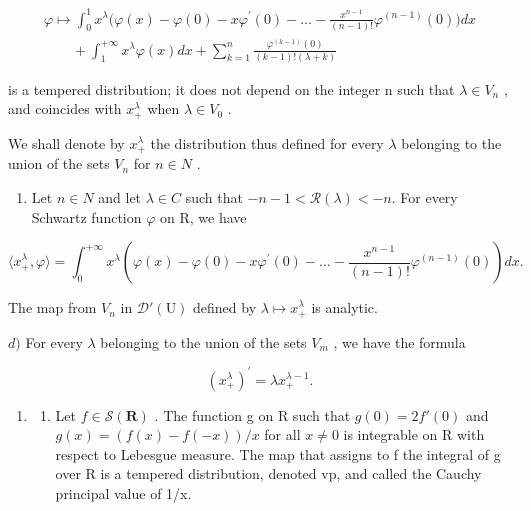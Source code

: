 \[
\begin{array}{l} \varphi \mapsto \int_ {0} ^ {1} x ^ {\lambda} \Big (\varphi (x) - \varphi (0) - x \varphi^ {\prime} (0) - \dots - \frac {x ^ {n - 1}}{(n - 1) !} \varphi^ {(n - 1)} (0) \Big) d x \\ \qquad + \int_ {1} ^ {+ \infty} x ^ {\lambda} \varphi (x) d x + \sum_ {k = 1} ^ {n} \frac {\varphi^ {(k - 1)} (0)}{(k - 1) ! (\lambda + k)} \end{array}
\]

is a tempered distribution; it does not depend on the integer n such that \(\lambda \in V_{n}\) , and coincides with \(x_{+}^{\lambda}\) when \(\lambda \in V_{0}\) .

We shall denote by \(x_{+}^{\lambda}\) the distribution thus defined for every \(\lambda\) belonging to the union of the sets \(V_{n}\) for \(n \in N\) .

\begin{enumerate}
\def\labelenumi{\alph{enumi})}
\setcounter{enumi}{2}
\tightlist
\item
  Let \(n \in N\) and let \(\lambda \in C\) such that \(-n - 1 < \mathcal{R}(\lambda) < -n\). For every Schwartz function \(\varphi\) on R, we have
\end{enumerate}

\[
\langle x _ {+} ^ {\lambda}, \varphi \rangle = \int_ {0} ^ {+ \infty} x ^ {\lambda} \left(\varphi (x) - \varphi (0) - x \varphi^ {\prime} (0) - \dots - \frac {x ^ {n - 1}}{(n - 1) !} \varphi^ {(n - 1)} (0)\right) d x.
\]

The map from \(V_{n}\) in \(\mathcal{D}'(\mathrm{U})\) defined by \(\lambda\mapsto x_{+}^{\lambda}\) is analytic.

\(d)\) For every \(\lambda\) belonging to the union of the sets \(V_{m}\) , we have the formula

\[
(x _ {+} ^ {\lambda}) ^ {\prime} = \lambda x _ {+} ^ {\lambda - 1}.
\]

\begin{enumerate}
\def\labelenumi{\arabic{enumi})}
\setcounter{enumi}{20}
\tightlist
\item
  \begin{enumerate}
  \def\labelenumii{\alph{enumii})}
  \tightlist
  \item
    Let \(f \in \mathcal{S}(\mathbf{R})\) . The function g on R such that \(g(0) = 2f'(0)\) and \(g(x) = (f(x) - f(-x))/x\) for all \(x \neq 0\) is integrable on R with respect to Lebesgue measure. The map that assigns to f the integral of g over R is a tempered distribution, denoted vp, and called the Cauchy principal value of 1/x.
  \end{enumerate}
\end{enumerate}

